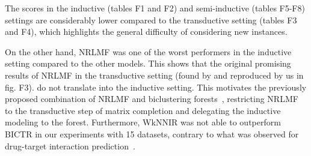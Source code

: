 \documentclass[letterpaper]{article}
\begin{document}

The scores in the inductive
(tables F1 and F2)
and semi-inductive
(tables F5-F8)
settings are considerably lower compared to the transductive setting
(tables F3 and F4),
which highlights the general difficulty of considering new instances.


 
On the other hand, NRLMF was one of the worst performers in the inductive setting compared to the other models. This shows that the original promising results of NRLMF in the transductive setting (found by \citet{liu_neighborhood_2016,liu_lpi-nrlmf_2017,liu_predicting_2020} and reproduced by us in
fig. F3).
do not translate into the inductive setting. This motivates the previously proposed combination of NRLMF and biclustering forests~\cite{pliakos_drug-target_2020}, restricting NRLMF to the transductive step of matrix completion and delegating the inductive modeling to the forest.
Furthermore, WkNNIR was not able to outperform BICTR in our experiments with 15 datasets, contrary to what was observed for drug-target interaction prediction~\cite{liu_drug-target_2022}.
\end{document}
